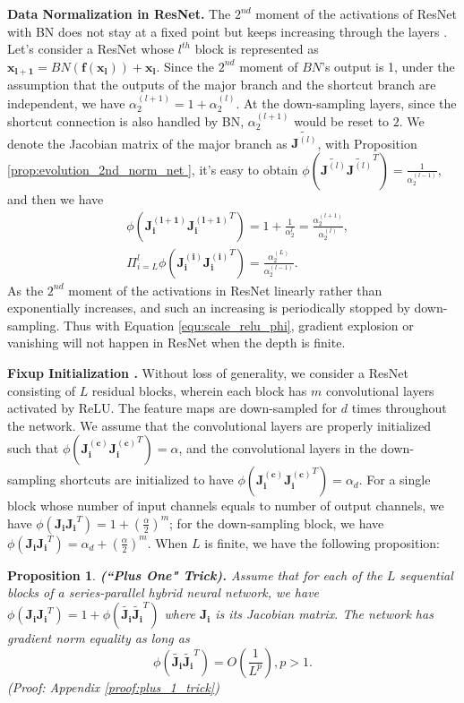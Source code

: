 \documentclass[10pt,journal,compsoc]{IEEEtran}
\newtheorem{prop}{Proposition}[section]
\begin{document}
\textbf{Data Normalization in ResNet.} The $2^{nd}$ moment of the activations of ResNet with BN does not stay at a fixed point but keeps increasing through the layers \cite{zhang2019fixup}. Let's consider a ResNet whose $l^{th}$ block is represented as $\mathbf{x_{l+1}} = BN(\mathbf{f}(\mathbf{x_l})) + \mathbf{x_l}$. Since the $2^{nd}$ moment of $BN$'s output is 1, under the assumption that the outputs of the major branch and the shortcut branch are independent, we have $\alpha_2^{(l+1)} = 1 + \alpha_2^{(l)}$. At the down-sampling layers, since the shortcut connection is also handled by BN, $\alpha_2^{(l+1)}$ would be reset to $2$. We denote the Jacobian matrix of the major branch as $\widetilde{\mathbf{J}^{(l)}}$, with Proposition \ref{prop:evolution_2nd_norm_net }, it's easy to obtain $\phi(\widetilde{\mathbf{J}^{(l)}}\widetilde{\mathbf{J}^{(l)}}^T) = \frac{1}{\alpha_2^{(l-1)}}$, and then we have
\begin{equation}
\begin{split}
    &\phi\left(\mathbf{J_i^{(l+1)}J_i^{(l+1)}}^T\right)=1 + \frac{1}{\alpha_2^{l}} = \frac{\alpha_2^{(l+1)}}{\alpha_2^{(l)}},\\
    &\Pi_{i=L}^l\phi\left(\mathbf{J_i^{(i)}J_i^{(i)}}^T\right) = \frac{\alpha_2^{(L)}}{\alpha_2^{(l-1)}}.
\end{split}
\label{equ:scale_relu_phi}
\end{equation}
As the $2^{nd}$ moment of the activations in ResNet linearly rather than exponentially increases, and such an increasing is periodically stopped by down-sampling. Thus with Equation \eqref{equ:scale_relu_phi}, gradient explosion or vanishing will not happen in ResNet when the depth is finite.

\textbf{Fixup Initialization \cite{zhang2019fixup}.} Without loss of generality, we consider a ResNet consisting of $L$ residual blocks, wherein each block has $m$ convolutional layers activated by ReLU. The feature maps are down-sampled for $d$ times throughout the network. We assume that the convolutional layers are properly initialized such that $\phi(\mathbf{J_i^{(c)}J_i^{(c)}}^T)=\alpha$, and the convolutional layers in the down-sampling shortcuts are initialized to have $\phi(\mathbf{J_i^{(c)}J_i^{(c)}}^T)=\alpha_d$. For a single block whose number of input channels equals to number of output channels, we have $\phi(\mathbf{J_iJ_i}^T) = 1+(\frac{\alpha}{2})^m$; for the down-sampling block, we have $\phi(\mathbf{J_iJ_i}^T) = \alpha_d + (\frac{\alpha}{2})^m$. When $L$ is finite, we have the following proposition:
\begin{prop}
\textbf{(``Plus One" Trick).} Assume that for each of the $L$ sequential blocks of a series-parallel hybrid neural network, we have $\phi(\mathbf{J_iJ_i}^T)=1+\phi(\widetilde{\mathbf{J_i}}\widetilde{\mathbf{J_i}}^T)$ where $\mathbf{J_i}$ is its Jacobian matrix. The network has gradient norm equality as long as
\begin{equation}
    \phi\left(\widetilde{\mathbf{J_i}}\widetilde{\mathbf{J_i}}^T\right) = O(\frac{1}{L^p}), p>1.
\label{equ:plus_1_trick}
\end{equation}
(Proof: Appendix \ref{proof:plus_1_trick})
\label{prop:plus_1_trick}
\end{prop}
\end{document}
